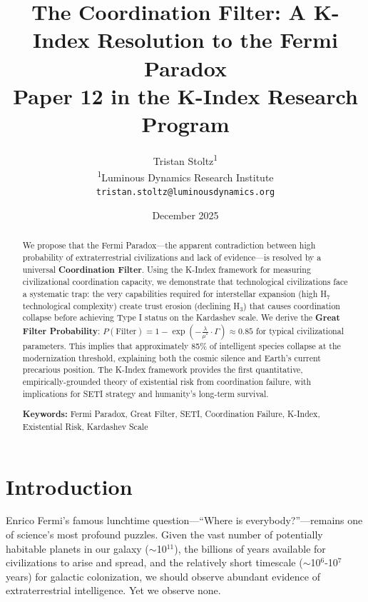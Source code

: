\documentclass[11pt,a4paper]{article}
\title{\textbf{The Coordination Filter: A K-Index Resolution to the Fermi Paradox} \\
\large Paper 12 in the K-Index Research Program}
\author{
Tristan Stoltz\textsuperscript{1} \\
\textsuperscript{1}Luminous Dynamics Research Institute \\
\texttt{tristan.stoltz@luminousdynamics.org}
}
\date{December 2025}
\begin{document}
\maketitle

\begin{abstract}
We propose that the Fermi Paradox---the apparent contradiction between high probability of extraterrestrial civilizations and lack of evidence---is resolved by a universal \textbf{Coordination Filter}. Using the K-Index framework for measuring civilizational coordination capacity, we demonstrate that technological civilizations face a systematic trap: the very capabilities required for interstellar expansion (high H$_7$ technological complexity) create trust erosion (declining H$_3$) that causes coordination collapse before achieving Type I status on the Kardashev scale. We derive the \textbf{Great Filter Probability}: $P(\text{Filter}) = 1 - \exp\left(-\frac{\lambda}{\mu^*} \cdot \Gamma\right) \approx 0.85$ for typical civilizational parameters. This implies that approximately 85\% of intelligent species collapse at the modernization threshold, explaining both the cosmic silence and Earth's current precarious position. The K-Index framework provides the first quantitative, empirically-grounded theory of existential risk from coordination failure, with implications for SETI strategy and humanity's long-term survival.

\vspace{0.5em}
\noindent\textbf{Keywords:} Fermi Paradox, Great Filter, SETI, Coordination Failure, K-Index, Existential Risk, Kardashev Scale
\end{abstract}

\section{Introduction}

Enrico Fermi's famous lunchtime question---``Where is everybody?''---remains one of science's most profound puzzles. Given the vast number of potentially habitable planets in our galaxy ($\sim$10$^{11}$), the billions of years available for civilizations to arise and spread, and the relatively short timescale ($\sim$10$^6$-10$^7$ years) for galactic colonization, we should observe abundant evidence of extraterrestrial intelligence. Yet we observe none.
\end{document}
